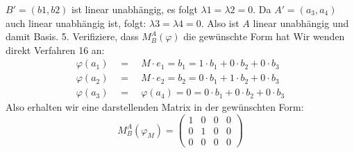 \documentclass{article}
\newcommand{\eq}{\mathbb{\quad = \quad}}
\newcommand{\legs}[2]{\left(\begin{array}{#1}#2\end{array}\right)}
\begin{document}
$B' = (b1,b2)$
ist linear unabhängig, es folgt
$ \lambda1 = \lambda2 = 0$.
Da
$A' = (a_3,a_4)$
auch linear unabhängig ist, folgt:
$\lambda3 = \lambda4 = 0$.
Also ist $A$ linear unabhängig und damit Basis.
5. Verifiziere, dass
$M^A_B(\varphi)$
die gewünschte Form hat
Wir wenden direkt Verfahren 16 an:
\begin{align*}
    \varphi(a_1) \eq M \cdot e_1 = b_1 = 1 \cdot b_1 +0 \cdot b_2 +0 \cdot b_3 \\
    \varphi(a_2) \eq M \cdot e_2 = b_2 = 0 \cdot b_1 +1 \cdot b_2 +0 \cdot b_3 \\
    \varphi(a_3) \eq \varphi(a_4) = 0 = 0 \cdot b_1 +0 \cdot b_2 +0 \cdot b_3
\end{align*}
Also erhalten wir eine darstellenden Matrix in der gewünschten Form:
\[
    M^A_B
    (\varphi_M ) =
    \legs{cccc}{
        1 & 0 & 0 & 0 \\
        0 & 1 & 0 & 0 \\
        0 & 0 & 0 & 0
    }
\]
\end{document}
